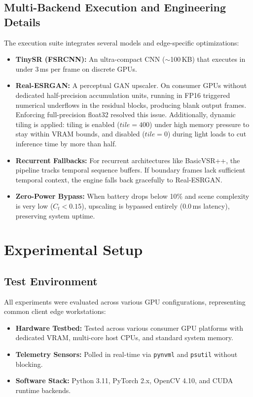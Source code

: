 \documentclass[conference]{IEEEtran}
\begin{document}
\subsection{Multi-Backend Execution and Engineering Details}
The execution suite integrates several models and edge-specific optimizations:
\begin{itemize}
    \item \textbf{TinySR (FSRCNN):} An ultra-compact CNN ($\sim$100\,KB) that executes in under $3$\,ms per frame on discrete GPUs.
    \item \textbf{Real-ESRGAN:} A perceptual GAN upscaler. On consumer GPUs without dedicated half-precision accumulation units, running in FP16 triggered numerical underflows in the residual blocks, producing blank output frames. Enforcing full-precision float32 resolved this issue. Additionally, dynamic tiling is applied: tiling is enabled ($tile=400$) under high memory pressure to stay within VRAM bounds, and disabled ($tile=0$) during light loads to cut inference time by more than half.
    \item \textbf{Recurrent Fallbacks:} For recurrent architectures like BasicVSR++, the pipeline tracks temporal sequence buffers. If boundary frames lack sufficient temporal context, the engine falls back gracefully to Real-ESRGAN.
    \item \textbf{Zero-Power Bypass:} When battery drops below 10\% and scene complexity is very low ($C_t < 0.15$), upscaling is bypassed entirely ($0.0$\,ms latency), preserving system uptime.
\end{itemize}

\section{Experimental Setup}

\subsection{Test Environment}
All experiments were evaluated across various GPU configurations, representing common client edge workstations:
\begin{itemize}
    \item \textbf{Hardware Testbed:} Tested across various consumer GPU platforms with dedicated VRAM, multi-core host CPUs, and standard system memory.
    \item \textbf{Telemetry Sensors:} Polled in real-time via \texttt{pynvml} and \texttt{psutil} without blocking.
    \item \textbf{Software Stack:} Python 3.11, PyTorch 2.x, OpenCV 4.10, and CUDA runtime backends.
\end{itemize}
\end{document}
